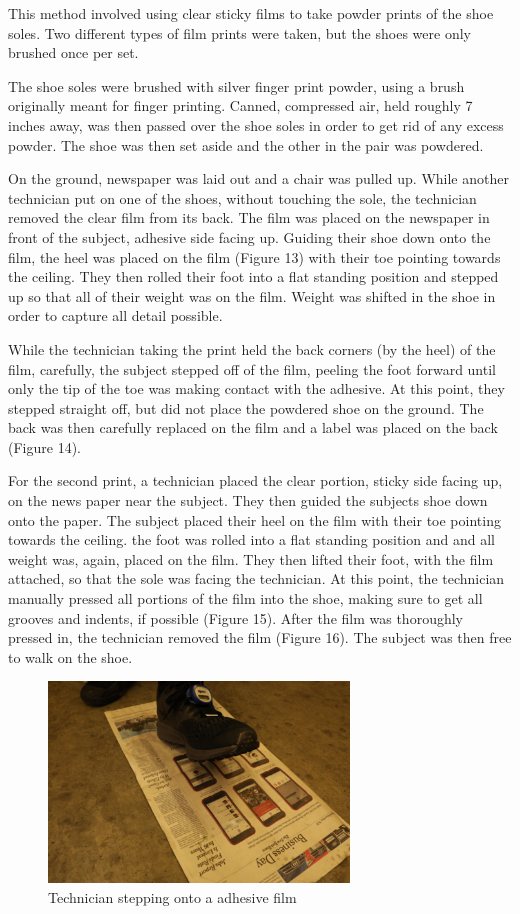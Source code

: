  This method involved using clear sticky films to take powder prints of the shoe soles. Two different types of film prints were taken, but the shoes were only brushed once per set. 
   
   The shoe soles were brushed with silver finger print powder, using a brush originally meant for finger printing. Canned, compressed air, held roughly 7 inches away, was then passed over the shoe soles in order to get rid of any excess powder. The shoe was then set aside and the other in the pair was powdered. 
   
   On the ground, newspaper was laid out and a chair was pulled up. While another technician put on one of the shoes, without touching the sole, the technician removed the clear film from its back. The film was placed on the newspaper in front of the subject, adhesive side facing up. Guiding their shoe down onto the film, the heel was placed on the film (Figure 13) with their toe pointing towards the ceiling. They then rolled their foot into a flat standing position and stepped up so that all of their weight was on the film. Weight was shifted in the shoe in order to capture all detail possible. 

   While the technician taking the print held the back corners (by the heel) of the film, carefully, the subject stepped off of the film, peeling the foot forward until only the tip of the toe was making contact with the adhesive. At this point, they stepped straight off, but did not place the powdered shoe on the ground. The back was then carefully replaced on the film and a label was placed on the back (Figure 14). 


   For the second print, a technician placed the clear portion, sticky side facing up, on the news paper near the subject. They then guided the subjects shoe down onto the paper. The subject placed their heel on the film with their toe pointing towards the ceiling. the foot was rolled into a flat standing position and and all weight was, again, placed on the film. They then lifted their foot, with the film attached, so that the sole was facing the technician. At this point, the technician manually pressed all portions of the film into the shoe, making sure to get all grooves and indents, if possible (Figure 15). After the film was thoroughly pressed in, the technician removed the film (Figure 16). The subject was then free to walk on the shoe. 
   
\begin{figure}[!htp]
\centering
\includegraphics[width=8cm]{Film_Step}
\caption{Technician stepping onto a adhesive film}
\label{Image 13}
\end{figure}

